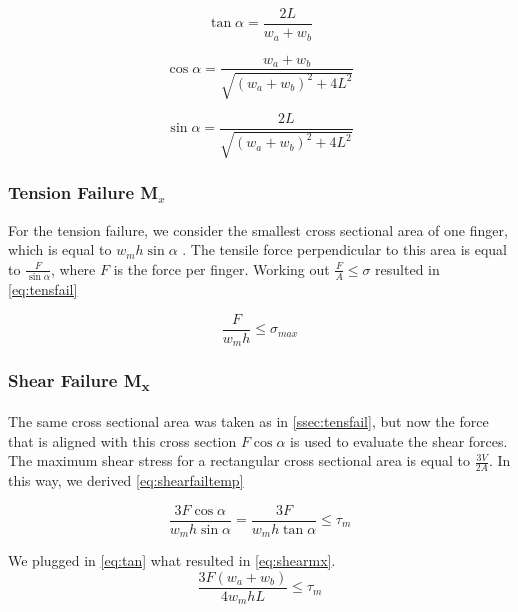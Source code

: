 \begin{equation}
	\label{eq:tan}
	\tan \alpha = \frac{2L}{w_a + w_b}
\end{equation}

\begin{equation}
	\label{eq:cos}
	\cos \alpha = \frac{w_a + w_b}{\sqrt{ \left( w_a + w_b \right) ^2 + 4L ^2 }}
\end{equation}

\begin{equation}
	\label{eq:sin}
	\sin \alpha = \frac{2L}{\sqrt{ \left( w_a + w_b \right) ^2 + 4L ^2 }}
\end{equation}


\subsubsection{Tension Failure M$_x$}\label{ssec:tensfail}
For the tension failure, we consider the smallest cross sectional area of one finger, which is equal to $w_m h \sin \alpha$ . The tensile force perpendicular to this area is equal to $\frac{F}{\sin \alpha}$, where $F$ is the force per finger. %
Working out $\frac{F}{A} \le \sigma$ resulted in \autoref{eq:tensfail}


\begin{equation}
		\label{eq:tensfail}
	\frac{F}{w_m  h} \le \sigma_{max}
\end{equation}


\subsubsection{Shear Failure M\textsubscript{x}}
The same cross sectional area was taken as in \autoref{ssec:tensfail}, but now the force that is aligned with this cross section $F \cos \alpha$ is used to evaluate the shear forces. The maximum shear stress for a rectangular cross sectional area is equal to $\frac{3V}{2A}$. In this way, we derived \autoref{eq:shearfailtemp}

\begin{equation}
	\label{eq:shearfailtemp}
	\frac{3F \cos \alpha}{w_m h \sin \alpha} = \frac{3F }{w_m h \tan \alpha} \le \tau_m
\end{equation}

We plugged in \autoref{eq:tan} what resulted in \autoref{eq:shearmx}.
\begin{equation}
	\label{eq:shearmx}
	\frac{ 3 F \left(w_a + w_b \right) }{ 4  w_m h L} \le \tau_m	
\end{equation}

